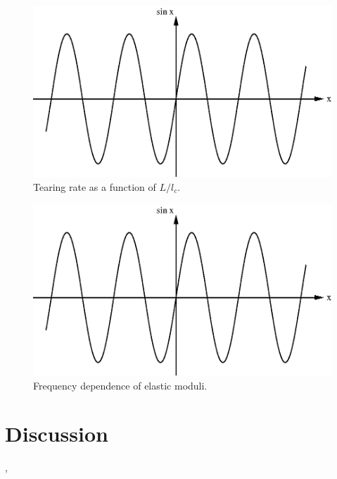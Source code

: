 \documentclass[prb,11pt]{revtex4-1}
\begin{document}
\begin{figure}[h!]
\centering
\includegraphics[scale=0.6]{sine}
\caption{\label{fig:tear}Tearing rate as a function of $L/l_c$.}
\end{figure}

\begin{figure}[h!]
\centering
\includegraphics[scale=0.6]{sine}
\caption{\label{fig:freq}Frequency dependence of elastic moduli.}
\end{figure}




\section{Discussion}

{\color{blue}{Finally I wax philosophical}},
{\color{green}{but}} {\color{cyan}{who is going to pay for the ink?}}
\end{document}
